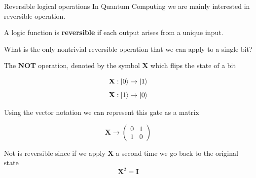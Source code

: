 \documentclass[11p,aspectratio=169]{beamer}
\begin{document}
\begin{frame}{Reversible logical operations}
    In Quantum Computing we are mainly interested in reversible operation.

    \begin{tcolorbox}[title=Reversible operation]
       A logic function is \textbf{reversible} if each output arises from a unique input.
    \end{tcolorbox}

    What is the only nontrivial reversible operation that we can apply to a single bit?
    
    \pause

    The \textbf{NOT} operation, denoted by the symbol $\textbf{X}$ which flips the state of a bit

    $$ \textbf{X} : \ket{0} \rightarrow \ket{1} $$
    $$ \textbf{X} : \ket{1} \rightarrow \ket{0} $$

    Using the vector notation we can represent this gate as a matrix

    $$ \textbf{X} \rightarrow \begin{pmatrix}
        0 & 1 \\
        1 & 0
    \end{pmatrix}$$

    Not is reversible since if we apply $\textbf{X}$ a second time we go back to the
    original state
    $$ \textbf{X}^2 = \textbf{I} $$
\end{frame}
\end{document}

